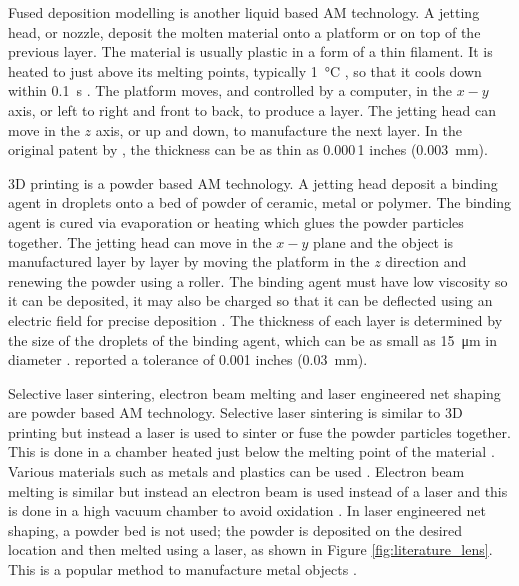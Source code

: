 Fused deposition modelling is another liquid based AM technology. A jetting head, or nozzle, deposit the molten material onto a platform or on top of the previous layer. The material is usually plastic in a form of a thin filament. It is heated to just above its melting points, typically \SI{1}{\degreeCelsius} \citep{crump1992apparatus}, so that it cools down within \SI{0.1}{\second} \citep{kruth1991material}. The platform moves, and controlled by a computer, in the $x-y$ axis, or left to right and front to back, to produce a layer. The jetting head can move in the $z$ axis, or up and down, to manufacture the next layer. In the original patent by \cite{crump1992apparatus}, the thickness can be as thin as 0.000\,1 inches (\SI{0.003}{\milli\metre}).

3D printing is a powder based AM technology. A jetting head deposit a binding agent in droplets onto a bed of powder of ceramic, metal or polymer. The binding agent is cured via evaporation or heating which glues the powder particles together. The jetting head can move in the $x-y$ plane and the object is manufactured layer by layer by moving the platform in the $z$ direction and renewing the powder using a roller. The binding agent must have low viscosity so it can be deposited, it may also be charged so that it can be deflected using an electric field for precise deposition \citep{sachs1990three}. The thickness of each layer is determined by the size of the droplets of the binding agent, which can be as small as \SI{15}{\micro\metre} in diameter \citep{sachs1990three}. \cite{sachs1990three} reported a tolerance of 0.001 inches (\SI{0.03}{\milli\metre}).

Selective laser sintering, electron beam melting and laser engineered net shaping are powder based AM technology. Selective laser sintering is similar to 3D printing but instead a laser is used to sinter or fuse the powder particles together. This is done in a chamber heated just below the melting point of the material \citep{wong2012review}. Various materials such as metals and plastics can be used \citep{wong2012review}. Electron beam melting is similar but instead an electron beam is used instead of a laser and this is done in a high vacuum chamber to avoid oxidation \citep{wong2012review}. In laser engineered net shaping, a powder bed is not used; the powder is deposited on the desired location and then melted using a laser, as shown in Figure \ref{fig:literature_lens}. This is a popular method to manufacture metal objects \citep{gibson2010additive}.

